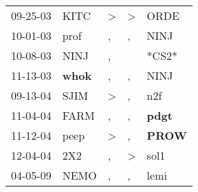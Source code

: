 \begin{supertabular}{p{0.07\textwidth}p{0.06\textwidth}p{0.02\textwidth}p{0.02\textwidth}p{0.06\textwidth}}
 09-25-03\textsuperscript{} &           KITC\textsuperscript{} &  \textgreater &  \textgreater &           ORDE\textsuperscript{} \\
 10-01-03\textsuperscript{} &           prof\textsuperscript{} &             , &             , &           NINJ\textsuperscript{} \\
 10-08-03\textsuperscript{} &           NINJ\textsuperscript{} &             , &               &                            *CS2* \\
 11-13-03\textsuperscript{} &  \textbf{whok\textsuperscript{}} &             , &             , &           NINJ\textsuperscript{} \\
 09-13-04\textsuperscript{} &           SJIM\textsuperscript{} &  \textgreater &             , &            n2f\textsuperscript{} \\
 11-04-04\textsuperscript{} &           FARM\textsuperscript{} &             , &             , &  \textbf{pdgt\textsuperscript{}} \\
 11-12-04\textsuperscript{} &           peep\textsuperscript{} &  \textgreater &             , &  \textbf{PROW\textsuperscript{}} \\
 12-04-04\textsuperscript{} &            2X2\textsuperscript{} &             , &  \textgreater &           sol1\textsuperscript{} \\
 04-05-09\textsuperscript{} &           NEMO\textsuperscript{} &             , &             , &           lemi\textsuperscript{} \\
\end{supertabular}
